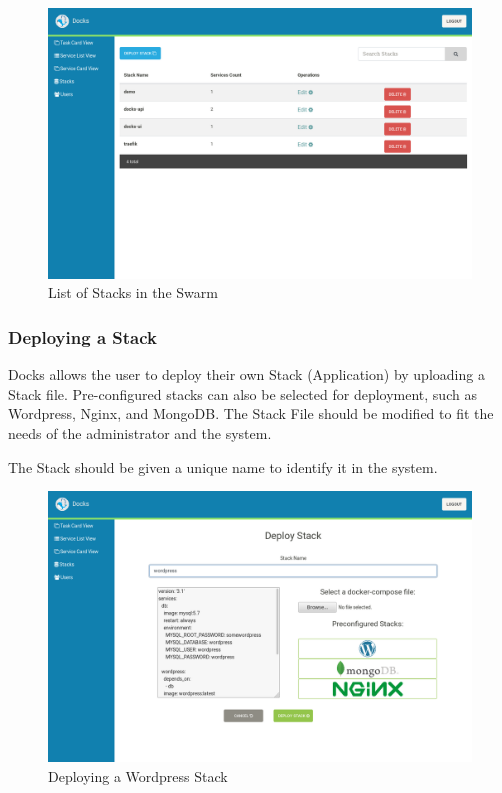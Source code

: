 \documentclass[]{article}
\begin{document}
\begin{figure}[H]
	\centering
	\includegraphics[scale=0.4]{stacks.png}
	\caption{List of Stacks in the Swarm}
\end{figure}

\subsubsection{Deploying a Stack}
Docks allows the user to deploy their own Stack (Application) by uploading
a Stack file. Pre-configured stacks can also be selected for deployment,
such as Wordpress, Nginx, and MongoDB. The Stack File should be modified
to fit the needs of the administrator and the system.

The Stack should be given a unique name to identify it in the system.

\begin{figure}[H]
	\centering
	\includegraphics[scale=0.4]{stacks_deploy.png}
	\caption{Deploying a Wordpress Stack}
\end{figure}
\end{document}
